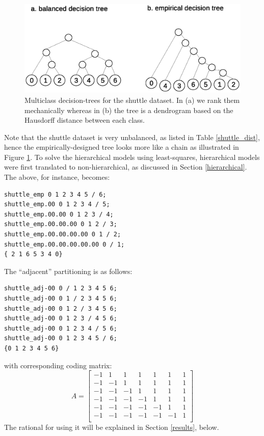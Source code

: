 \documentclass{article}
\newenvironment{eqnnon}{\begin{equation*}}{\end{equation*}}
\begin{document}
\begin{figure}
	\includegraphics[width=\textwidth]{shuttle_tree.eps}
	\caption{Multiclass decision-trees for the shuttle dataset. 
	In (a) we rank them mechanically whereas in (b) the tree is a dendrogram based on the Hausdorff distance between each class.}\label{shuttle_tree}
\end{figure}

Note that the shuttle dataset is very unbalanced, 
as listed in Table \ref{shuttle_dist},
hence  the empirically-designed tree looks more like a chain
as illustrated in Figure \ref{shuttle_tree}.
To solve the hierarchical models using least-squares, hierarchical models were first translated to non-hierarchical, as discussed in Section \ref{hierarchical}.
The above, for instance, becomes:
\begin{verbatim}
shuttle_emp 0 1 2 3 4 5 / 6;
shuttle_emp.00 0 1 2 3 4 / 5;
shuttle_emp.00.00 0 1 2 3 / 4;
shuttle_emp.00.00.00 0 1 2 / 3;
shuttle_emp.00.00.00.00 0 1 / 2;
shuttle_emp.00.00.00.00.00 0 / 1;
{ 2 1 6 5 3 4 0}
\end{verbatim}

The ``adjacent'' partitioning is as follows:
\begin{verbatim}
shuttle_adj-00 0 / 1 2 3 4 5 6;
shuttle_adj-00 0 1 / 2 3 4 5 6;
shuttle_adj-00 0 1 2 / 3 4 5 6;
shuttle_adj-00 0 1 2 3 / 4 5 6;
shuttle_adj-00 0 1 2 3 4 / 5 6;
shuttle_adj-00 0 1 2 3 4 5 / 6;
{0 1 2 3 4 5 6}
\end{verbatim}
with corresponding coding matrix:
\begin{eqnnon}
A = 
\begin{bmatrix}
-1 & 1 & 1 & 1 & 1 & 1 & 1 \\
-1 & -1 & 1 & 1 & 1 & 1 & 1 \\
-1 & -1 & -1 & 1 & 1 & 1 & 1 \\
-1 & -1 & -1 & -1 & 1 & 1 & 1 \\
-1 & -1 & -1 & -1 & -1 & 1 & 1 \\
-1 & -1 & -1 & -1 & -1 & -1 & 1 \\
\end{bmatrix}
	\label{adjacent}
\end{eqnnon}
The rational for using it will be explained in Section \ref{results}, below.
\end{document}

